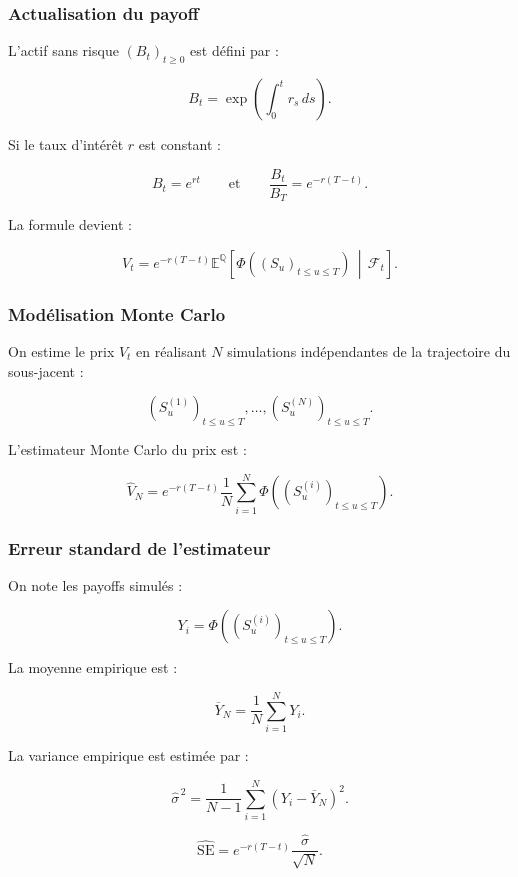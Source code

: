 \documentclass[aspectratio=169,11pt]{beamer}
\begin{document}
\begin{frame}
    \frametitle{Actualisation du payoff}

    L'actif sans risque $(B_t)_{t\geq 0}$ est défini par :

    \[
        \boxed{
        B_t
        =
        \exp\left(
            \int_0^t r_s\,ds
        \right).
        }
    \]

    Si le taux d'intérêt $r$ est constant :

    \[
        B_t=e^{rt}
        \qquad\text{et}\qquad
        \frac{B_t}{B_T}=e^{-r(T-t)}.
    \]

    La formule devient :

    \[
        \boxed{
        V_t
        =
        e^{-r(T-t)}
        \mathbb{E}^{\mathbb{Q}}
        \left[
            \Phi\left((S_u)_{t\leq u\leq T}\right)
            \,\middle|\,
            \mathcal{F}_t
        \right].
        }
    \]

\end{frame}

\begin{frame}
    \frametitle{Modélisation Monte Carlo}

    On estime le prix $V_t$ en réalisant $N$ simulations indépendantes
    de la trajectoire du sous-jacent :

    \[
        (S_u^{(1)})_{t\leq u\leq T},
        \ldots,
        (S_u^{(N)})_{t\leq u\leq T}.
    \]

    \vspace{0.4cm}

    L'estimateur Monte Carlo du prix est :

    \[
        \boxed{
        \widehat{V}_N
        =
        e^{-r(T-t)}
        \frac{1}{N}
        \sum_{i=1}^{N}
        \Phi\left((S_u^{(i)})_{t\leq u\leq T}\right).
        }
    \]

\end{frame}

\begin{frame}
    \frametitle{Erreur standard de l'estimateur}

    On note les payoffs simulés :

    \[
        Y_i
        =
        \Phi\left((S_u^{(i)})_{t\leq u\leq T}\right).
    \]

    La moyenne empirique est :

    \[
        \overline{Y}_N
        =
        \frac{1}{N}
        \sum_{i=1}^{N}
        Y_i.
    \]

    La variance empirique est estimée par :

    \[
        \widehat{\sigma}^{\,2}
        =
        \frac{1}{N-1}
        \sum_{i=1}^{N}
        \left(Y_i-\overline{Y}_N\right)^2.
    \]

    \[
        \boxed{
        \widehat{\mathrm{SE}}
        =
        e^{-r(T-t)}
        \frac{\widehat{\sigma}}{\sqrt{N}}.
        }
    \]

\end{frame}
\end{document}
